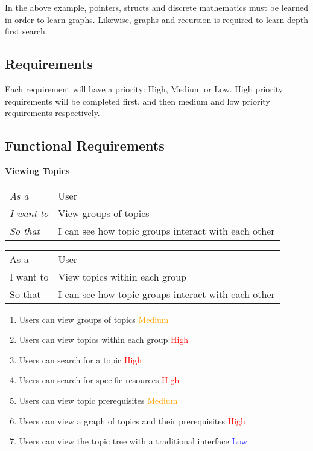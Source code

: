In the above example, pointers, structs and discrete mathematics must be learned in order to learn graphs. Likewise, graphs and recursion is required to learn depth first search.\\

\subsection{Requirements}
Each requirement will have a priority: High, Medium or Low. High priority requirements will be completed first, and then medium and low priority requirements respectively. \\

\subsection{Functional Requirements}

\textbf{Viewing Topics}

\begin{table}[]
\begin{tabular}{ll}
\textit{As a}      & User                                                \\
\textit{I want to} & View groups of topics                               \\
\textit{So that}   & I can see how topic groups interact with each other
\end{tabular}
\end{table}

\begin{table}[]
\begin{tabular}{ll}
As a      & User                                                \\
I want to & View topics within each group                       \\
So that   & I can see how topic groups interact with each other
\end{tabular}
\end{table}

    \begin{enumerate}
    \item Users can view groups of topics \textcolor{Orange}{Medium}
    \item Users can view topics within each group \textcolor{Red}{High}
    \item Users can search for a topic \textcolor{Red}{High}
    \item Users can search for specific resources \textcolor{Red}{High}
    \item Users can view topic prerequisites \textcolor{Orange}{Medium}
    \item Users can view a graph of topics and their prerequisites \textcolor{Red}{High}
    \item Users can view the topic tree with a traditional interface \textcolor{Blue}{Low}
    \end{enumerate}

